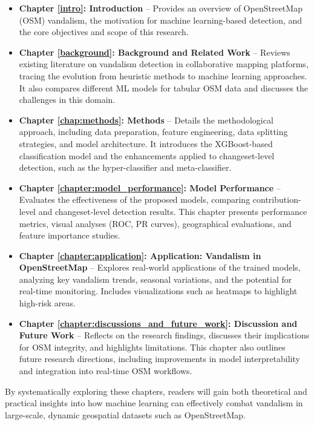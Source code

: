 \documentclass[
    13pt, %
    a4paper, %
    listof=totoc, %
    bibliography=totoc, %
    index=totoc, %
    headsepline
]{scrreprt}
\begin{document}
\begin{itemize}
  \item \textbf{Chapter \ref{intro}: Introduction} – Provides an overview of OpenStreetMap (OSM) vandalism, the motivation for machine learning-based detection, and the core objectives and scope of this research.
  
  \item \textbf{Chapter \ref{background}: Background and Related Work} – Reviews existing literature on vandalism detection in collaborative mapping platforms, tracing the evolution from heuristic methods to machine learning approaches. It also compares different ML models for tabular OSM data and discusses the challenges in this domain.
  
  \item \textbf{Chapter \ref{chap:methods}: Methods} – Details the methodological approach, including data preparation, feature engineering, data splitting strategies, and model architecture. It introduces the XGBoost-based classification model and the enhancements applied to changeset-level detection, such as the hyper-classifier and meta-classifier.

  \item \textbf{Chapter \ref{chapter:model_performance}: Model Performance} – Evaluates the effectiveness of the proposed models, comparing contribution-level and changeset-level detection results. This chapter presents performance metrics, visual analyses (ROC, PR curves), geographical evaluations, and feature importance studies.

  \item \textbf{Chapter \ref{chapter:application}: Application: Vandalism in OpenStreetMap} – Explores real-world applications of the trained models, analyzing key vandalism trends, seasonal variations, and the potential for real-time monitoring. Includes visualizations such as heatmaps to highlight high-risk areas.

  \item \textbf{Chapter \ref{chapter:discussions_and_future_work}: Discussion and Future Work} – Reflects on the research findings, discusses their implications for OSM integrity, and highlights limitations. This chapter also outlines future research directions, including improvements in model interpretability and integration into real-time OSM workflows.
  
\end{itemize}

By systematically exploring these chapters, readers will gain both theoretical and practical insights into how machine learning can effectively combat vandalism in large-scale, dynamic geospatial datasets such as OpenStreetMap.
\end{document}
